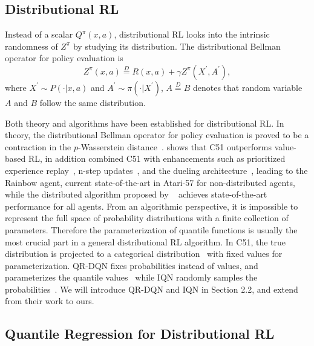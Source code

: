 \documentclass{article}
\begin{document}
\subsection{Distributional RL}
Instead of a scalar $Q^\pi(x, a)$, distributional RL looks into the intrinsic randomness of $Z^\pi$ by studying its distribution. The distributional Bellman operator for policy evaluation is 
\begin{equation*}
    Z^\pi(x, a) \stackrel{D}{=} R(x, a)+\gamma Z^\pi\left(X^{\prime}, A^{\prime}\right),
\end{equation*}
where $X^\prime \sim P(\cdot|x,a)$ 
and $A^\prime\sim\pi(\cdot|X^\prime)$,  $A\stackrel{D}{=}B$ denotes that random variable $A$ and $B$ follow the same distribution.

Both theory and algorithms have been established for distributional RL. In theory, the distributional Bellman operator for policy evaluation is proved to be a contraction in the $p$-Wasserstein distance~\citep{bellemare2017distributional}. \cite{bellemare2017distributional} shows that C51 outperforms value-based RL, in addition \cite{hessel2018rainbow} combined C51 with enhancements such as prioritized experience replay~\citep{schaul2016prioritized}, n-step updates~\citep{sutton1988learning}, and the dueling architecture~\citep{wang2016dueling}, leading to the Rainbow agent, current state-of-the-art in Atari-57 for non-distributed agents, while the distributed algorithm proposed by ~\cite{kapturowski2018recurrent} achieves state-of-the-art performance for all agents.
From an algorithmic perspective, it is impossible to represent the full space of probability distributions with a finite collection of parameters. Therefore the parameterization of quantile functions is usually the most crucial part in a general distributional RL algorithm.
In C51, the true distribution is projected to a categorical distribution~\citep{bellemare2017distributional} with fixed values for parameterization. QR-DQN fixes probabilities instead of values, and parameterizes the quantile values~\citep{dabney2018implicit} while IQN randomly samples the probabilities~\citep{dabney2018implicit}. We will introduce QR-DQN and IQN in Section 2.2, and extend from their work to ours.






\subsection{Quantile Regression for Distributional RL}
\end{document}
